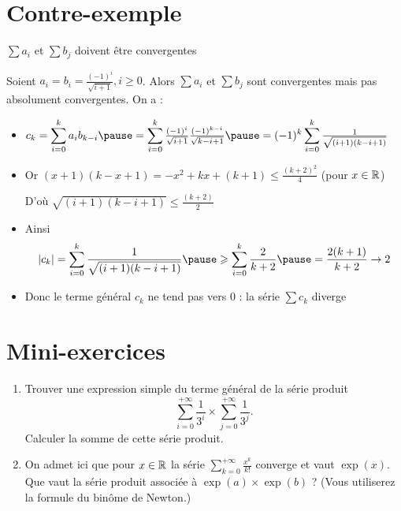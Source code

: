 \section{Contre-exemple}

\begin{frame}
$\sum a_i$ et $\sum b_j$ doivent être 
convergentes

\pause
\begin{exemple}
Soient $a_i=b_i=\frac{(-1)^{i}}{\sqrt {i+1}}, i\ge 0$. \pause Alors $\sum a_i$ et $\sum b_j$ sont convergentes mais pas absolument convergentes. \pause On a :
\begin{itemize}
\item $c_k = \displaystyle\sum_{i=0}^k a_i b_{k-i}  
\pause = \sum_{i=0}^k \tfrac{(-1)^{i}}{\sqrt {i+1}} \tfrac{(-1)^{k-i}}{\sqrt{k-i+1}} 
\pause = (-1)^{k} \sum_{i=0}^k \tfrac{1}{\sqrt{(i+1)(k-i+1)}}$

\item\pause Or $(x+1)(k-x+1)=-x^2+kx+(k+1) \le \frac{(k+2)^2}{4}$ (pour $x\in\mathbb{R}$)

\pause
D'o\`u $\sqrt{(i+1)(k-i+1)} \le \frac{(k+2)}{2}$

\item\pause Ainsi
$$|c_k|=\sum_{i=0}^k\frac{1}{\sqrt{(i+1)(k-i+1)}} 
\pause\ge \sum_{i=0}^k \frac{2}{k+2} 
\pause= \frac{2(k+1)}{k+2} \to 2$$
\item\pause Donc le terme général $c_k$ ne tend pas vers $0$ \pause : la série $\sum c_k$ diverge
\end{itemize}
\end{exemple}
\end{frame}


\section{Mini-exercices}

\begin{frame}
\begin{miniexercice}
\begin{enumerate}
  \item Trouver une expression simple du terme général de la série produit
  $$\sum_{i=0}^{+\infty} \frac{1}{3^i} \times \sum_{j=0}^{+\infty} \frac{1}{3^j}.$$
  Calculer la somme de cette série produit.
  \item On admet ici que pour $x\in \mathbb{R}$ la série $\sum_{k=0}^{+\infty} \frac{x^k}{k!}$ converge et vaut
  $\exp(x)$.
  Que vaut la série produit associée à $\exp(a) \times \exp(b)$ ?
  (Vous utiliserez la formule du binôme de Newton.)
\end{enumerate}
\end{miniexercice}
\end{frame}

